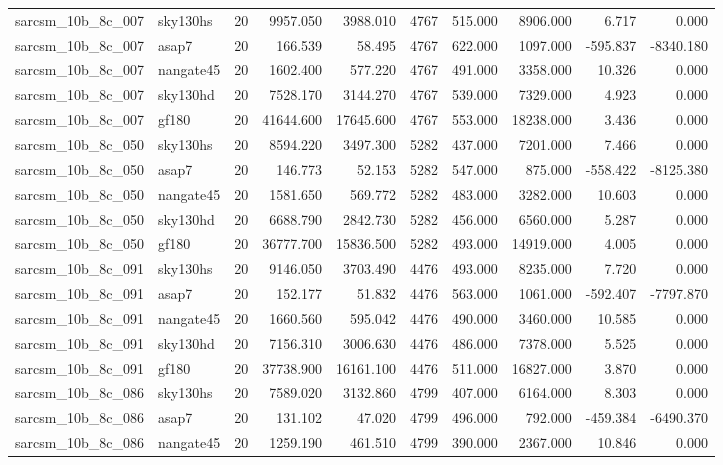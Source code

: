 \begin{tabular}{llrrrrrrrr}
sarcsm\_10b\_8c\_007 & sky130hs & 20 & 9957.050 & 3988.010 & 4767 & 515.000 & 8906.000 & 6.717 & 0.000 \\
sarcsm\_10b\_8c\_007 & asap7 & 20 & 166.539 & 58.495 & 4767 & 622.000 & 1097.000 & -595.837 & -8340.180 \\
sarcsm\_10b\_8c\_007 & nangate45 & 20 & 1602.400 & 577.220 & 4767 & 491.000 & 3358.000 & 10.326 & 0.000 \\
sarcsm\_10b\_8c\_007 & sky130hd & 20 & 7528.170 & 3144.270 & 4767 & 539.000 & 7329.000 & 4.923 & 0.000 \\
sarcsm\_10b\_8c\_007 & gf180 & 20 & 41644.600 & 17645.600 & 4767 & 553.000 & 18238.000 & 3.436 & 0.000 \\
sarcsm\_10b\_8c\_050 & sky130hs & 20 & 8594.220 & 3497.300 & 5282 & 437.000 & 7201.000 & 7.466 & 0.000 \\
sarcsm\_10b\_8c\_050 & asap7 & 20 & 146.773 & 52.153 & 5282 & 547.000 & 875.000 & -558.422 & -8125.380 \\
sarcsm\_10b\_8c\_050 & nangate45 & 20 & 1581.650 & 569.772 & 5282 & 483.000 & 3282.000 & 10.603 & 0.000 \\
sarcsm\_10b\_8c\_050 & sky130hd & 20 & 6688.790 & 2842.730 & 5282 & 456.000 & 6560.000 & 5.287 & 0.000 \\
sarcsm\_10b\_8c\_050 & gf180 & 20 & 36777.700 & 15836.500 & 5282 & 493.000 & 14919.000 & 4.005 & 0.000 \\
sarcsm\_10b\_8c\_091 & sky130hs & 20 & 9146.050 & 3703.490 & 4476 & 493.000 & 8235.000 & 7.720 & 0.000 \\
sarcsm\_10b\_8c\_091 & asap7 & 20 & 152.177 & 51.832 & 4476 & 563.000 & 1061.000 & -592.407 & -7797.870 \\
sarcsm\_10b\_8c\_091 & nangate45 & 20 & 1660.560 & 595.042 & 4476 & 490.000 & 3460.000 & 10.585 & 0.000 \\
sarcsm\_10b\_8c\_091 & sky130hd & 20 & 7156.310 & 3006.630 & 4476 & 486.000 & 7378.000 & 5.525 & 0.000 \\
sarcsm\_10b\_8c\_091 & gf180 & 20 & 37738.900 & 16161.100 & 4476 & 511.000 & 16827.000 & 3.870 & 0.000 \\
sarcsm\_10b\_8c\_086 & sky130hs & 20 & 7589.020 & 3132.860 & 4799 & 407.000 & 6164.000 & 8.303 & 0.000 \\
sarcsm\_10b\_8c\_086 & asap7 & 20 & 131.102 & 47.020 & 4799 & 496.000 & 792.000 & -459.384 & -6490.370 \\
sarcsm\_10b\_8c\_086 & nangate45 & 20 & 1259.190 & 461.510 & 4799 & 390.000 & 2367.000 & 10.846 & 0.000 \\

\end{tabular}
